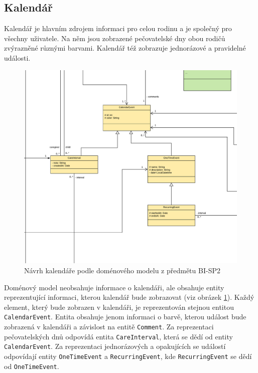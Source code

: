     \subsection{Kalendář}    
        Kalendář je hlavním zdrojem informaci pro celou rodinu a je společný pro všechny uživatele. Na něm jsou zobrazené pečovatelské dny obou rodičů zvýrazněné různými barvami. Kalendář též zobrazuje jednorázové a pravidelné události.
        
        \begin{figure}\centering
	        \includegraphics[width=1.0\textwidth]{pdfs/CalendarInfo1}
	        \caption[Současný návrh kalendáře]{Návrh kalendáře podle doménového modelu z předmětu BI-SP2}\label{image:calendar-info}
        \end{figure}
        Doménový model neobsahuje informace o kalendáři, ale obsahuje entity reprezentující informaci, kterou kalendář bude zobrazovat (viz obrázek \ref{image:calendar-info}). Každý element, který bude zobrazen v kalendáři, je reprezentován stejnou entitou \verb|CalendarEvent|. Entita obsahuje jenom informaci o barvě, kterou událost bude zobrazená v kalendáři a závislost na entitě \verb|Comment|. Za reprezentaci pečovatelských dnů odpovídá entita \verb|CareInterval|, která se dědí od entity \verb|CalendarEvent|. Za reprezentaci jednorázových a opakujících se událostí odpovídají entity \verb|OneTimeEvent| a \verb|RecurringEvent|, kde \verb|RecurringEvent| se dědí od \verb|OneTimeEvent|.
        
